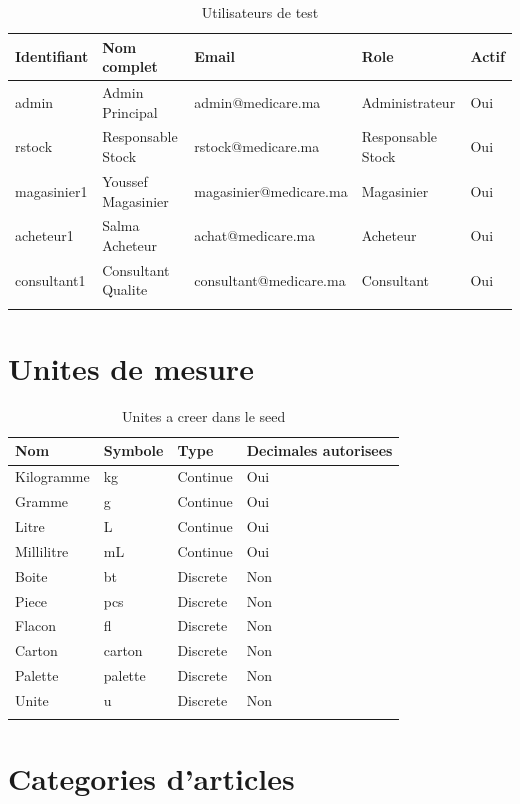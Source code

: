 \documentclass[11pt,a4paper]{article}
\begin{document}
\begin{longtable}{|p{3cm}|p{3.2cm}|p{4cm}|p{3cm}|p{2cm}|}
\hline
\textbf{Identifiant} & \textbf{Nom complet} & \textbf{Email} & \textbf{Role} & \textbf{Actif} \\
\hline
admin & Admin Principal & admin@medicare.ma & Administrateur & Oui \\
\hline
rstock & Responsable Stock & rstock@medicare.ma & Responsable Stock & Oui \\
\hline
magasinier1 & Youssef Magasinier & magasinier@medicare.ma & Magasinier & Oui \\
\hline
acheteur1 & Salma Acheteur & achat@medicare.ma & Acheteur & Oui \\
\hline
consultant1 & Consultant Qualite & consultant@medicare.ma & Consultant & Oui \\
\hline
\caption{Utilisateurs de test}
\end{longtable}

\section{Unites de mesure}

\begin{longtable}{|p{3.2cm}|p{2cm}|p{3cm}|p{4cm}|}
\hline
\textbf{Nom} & \textbf{Symbole} & \textbf{Type} & \textbf{Decimales autorisees} \\
\hline
Kilogramme & kg & Continue & Oui \\
\hline
Gramme & g & Continue & Oui \\
\hline
Litre & L & Continue & Oui \\
\hline
Millilitre & mL & Continue & Oui \\
\hline
Boite & bt & Discrete & Non \\
\hline
Piece & pcs & Discrete & Non \\
\hline
Flacon & fl & Discrete & Non \\
\hline
Carton & carton & Discrete & Non \\
\hline
Palette & palette & Discrete & Non \\
\hline
Unite & u & Discrete & Non \\
\hline
\caption{Unites a creer dans le seed}
\end{longtable}

\section{Categories d'articles}
\end{document}
